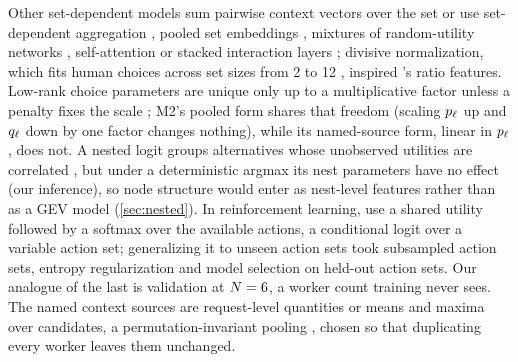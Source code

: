 Other set-dependent models sum pairwise context vectors over the set \citep{seshadri2019cdm} or
use set-dependent aggregation \citep{rosenfeld2020setdependent}, pooled set embeddings
\citep{pfannschmidt2022context}, mixtures of random-utility networks \citep{aouad2023rumnet},
self-attention \citep{ko2024attention} or stacked interaction layers \citep{zhang2026deephalo};
divisive normalization, which fits human choices across set sizes from 2 to 12
\citep{webb2021normalization}, inspired 's ratio features. Low-rank choice parameters are
unique only up to a multiplicative factor unless a penalty fixes the scale \citep{ko2024attention};
M2's pooled form shares that freedom (scaling $p_{\ell}$ up and $q_{\ell}$ down by one factor
changes nothing), while its named-source form, linear in $p_{\ell}$, does not. A nested logit
groups alternatives whose unobserved utilities are correlated \citep{train2009gev}, but under a
deterministic argmax its nest parameters have no effect (our inference), so node structure would
enter as nest-level features rather than as a GEV model (\cref{sec:nested}).
In reinforcement learning, \citet{jain2020newactions} use a shared utility followed by a softmax
over the available actions, a conditional logit over a variable action set; generalizing it to
unseen action sets took subsampled action sets, entropy regularization and model selection on
held-out action sets. Our analogue of the last is validation at $N = 6$, a worker count
training never sees. The named context sources are request-level quantities or means and maxima
over candidates, a permutation-invariant pooling \citep{zaheer2017deepsets}, chosen so that
duplicating every worker leaves them unchanged.

